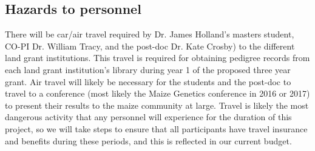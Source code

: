 \documentclass[12pt]{article}
\begin{document}
\subsection*{Hazards to personnel}
There will be car/air travel required by Dr. James Holland's masters student, CO-PI Dr. William Tracy, and the post-doc Dr. Kate Crosby) to the different land grant institutions. This travel is required for obtaining pedigree records from each land grant institution's library during year 1 of the proposed three year grant. Air travel will likely be necessary for the students and the post-doc to travel to a conference (most likely the Maize Genetics conference in 2016 or 2017) to present their results to the maize community at large. Travel is likely the most dangerous activity that any personnel will experience for the duration of this project, so we will take steps to ensure that all participants have travel insurance and benefits during these periods, and this is reflected in our current budget. 
\end{document}
